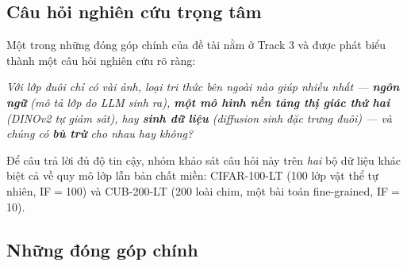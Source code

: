\subsection{Câu hỏi nghiên cứu trọng tâm}

Một trong những đóng góp chính của đề tài nằm ở Track 3 và được phát biểu thành một câu hỏi nghiên cứu rõ ràng:

\begin{mdframed}
\textit{Với lớp đuôi chỉ có vài ảnh, loại tri thức bên ngoài nào giúp nhiều nhất --- \textbf{ngôn
ngữ} (mô tả lớp do LLM sinh ra), \textbf{một mô hình nền tảng thị giác thứ hai} (DINOv2 tự giám
sát), hay \textbf{sinh dữ liệu} (diffusion sinh đặc trưng đuôi) --- và chúng có \textbf{bù trừ} cho
nhau hay không?}
\end{mdframed}

Để câu trả lời đủ độ tin cậy, nhóm khảo sát câu hỏi này trên \emph{hai} bộ dữ liệu khác biệt cả về
quy mô lớp lẫn bản chất miền: CIFAR-100-LT (100 lớp vật thể tự nhiên, IF$=$100) và CUB-200-LT (200
loài chim, một bài toán fine-grained, IF$=$10).

\subsection{Những đóng góp chính}

